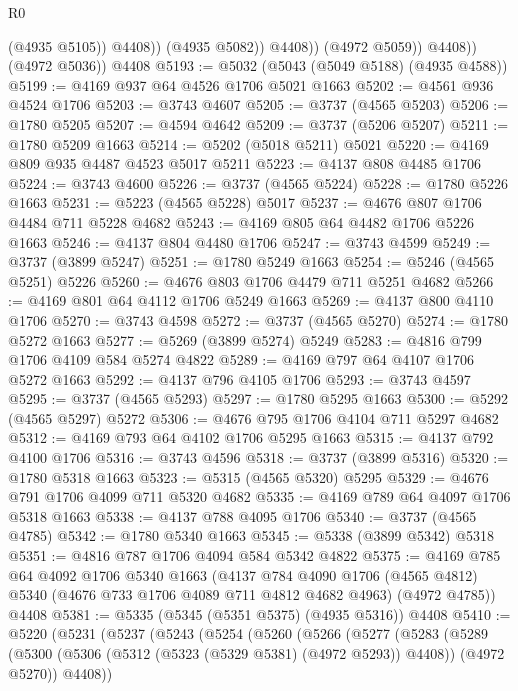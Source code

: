 \begin{lexlean}{R0}
\begin{coremodule}
                        (@4935 @5105))
                      @4408))
                  (@4935 @5082))
                @4408))
            (@4972 @5059))
          @4408))
      (@4972 @5036))
    @4408
@5193 := @5032 (@5043 (@5049 @5188) (@4935 @4588))
@5199 := @4169 @937 @64 @4526 @1706 @5021 @1663
@5202 := @4561 @936 @4524 @1706
@5203 := @3743 @4607
@5205 := @3737 (@4565 @5203)
@5206 := @1780 @5205
@5207 := @4594 @4642
@5209 := @3737 (@5206 @5207)
@5211 := @1780 @5209 @1663
@5214 := @5202 (@5018 @5211) @5021
@5220 := @4169 @809 @935 @4487 @4523 @5017 @5211
@5223 := @4137 @808 @4485 @1706
@5224 := @3743 @4600
@5226 := @3737 (@4565 @5224)
@5228 := @1780 @5226 @1663
@5231 := @5223 (@4565 @5228) @5017
@5237 := @4676 @807 @1706 @4484 @711 @5228 @4682
@5243 := @4169 @805 @64 @4482 @1706 @5226 @1663
@5246 := @4137 @804 @4480 @1706
@5247 := @3743 @4599
@5249 := @3737 (@3899 @5247)
@5251 := @1780 @5249 @1663
@5254 := @5246 (@4565 @5251) @5226
@5260 := @4676 @803 @1706 @4479 @711 @5251 @4682
@5266 := @4169 @801 @64 @4112 @1706 @5249 @1663
@5269 := @4137 @800 @4110 @1706
@5270 := @3743 @4598
@5272 := @3737 (@4565 @5270)
@5274 := @1780 @5272 @1663
@5277 := @5269 (@3899 @5274) @5249
@5283 := @4816 @799 @1706 @4109 @584 @5274 @4822
@5289 := @4169 @797 @64 @4107 @1706 @5272 @1663
@5292 := @4137 @796 @4105 @1706
@5293 := @3743 @4597
@5295 := @3737 (@4565 @5293)
@5297 := @1780 @5295 @1663
@5300 := @5292 (@4565 @5297) @5272
@5306 := @4676 @795 @1706 @4104 @711 @5297 @4682
@5312 := @4169 @793 @64 @4102 @1706 @5295 @1663
@5315 := @4137 @792 @4100 @1706
@5316 := @3743 @4596
@5318 := @3737 (@3899 @5316)
@5320 := @1780 @5318 @1663
@5323 := @5315 (@4565 @5320) @5295
@5329 := @4676 @791 @1706 @4099 @711 @5320 @4682
@5335 := @4169 @789 @64 @4097 @1706 @5318 @1663
@5338 := @4137 @788 @4095 @1706
@5340 := @3737 (@4565 @4785)
@5342 := @1780 @5340 @1663
@5345 := @5338 (@3899 @5342) @5318
@5351 := @4816 @787 @1706 @4094 @584 @5342 @4822
@5375 := @4169
    @785
    @64
    @4092
    @1706
    @5340
    @1663
    (@4137
      @784
      @4090
      @1706
      (@4565 @4812)
      @5340
      (@4676 @733 @1706 @4089 @711 @4812 @4682 @4963)
      (@4972 @4785))
    @4408
@5381 := @5335 (@5345 (@5351 @5375) (@4935 @5316)) @4408
@5410 := @5220
    (@5231
      (@5237
        (@5243
          (@5254
            (@5260
              (@5266
                (@5277
                  (@5283
                    (@5289
                      (@5300
                        (@5306 (@5312 (@5323 (@5329 @5381) (@4972 @5293)) @4408))
                        (@4972 @5270))
                      @4408))

\end{coremodule}
\end{lexlean}
